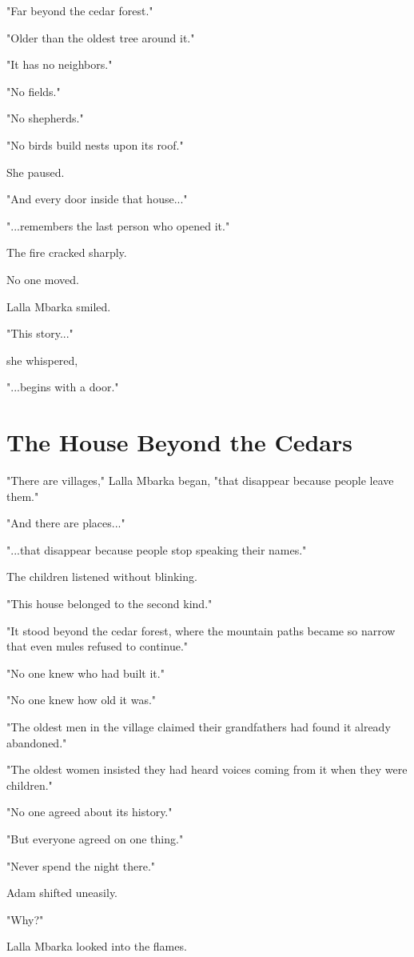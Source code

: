 \documentclass[12pt,openany]{book}
\begin{document}
"Far beyond the cedar forest."

"Older than the oldest tree around it."

"It has no neighbors."

"No fields."

"No shepherds."

"No birds build nests upon its roof."

She paused.

"And every door inside that house..."

"...remembers the last person who opened it."

The fire cracked sharply.

No one moved.

Lalla Mbarka smiled.

"This story..."

she whispered,

"...begins with a door."
\section*{The House Beyond the Cedars}

"There are villages," Lalla Mbarka began, "that disappear because people leave them."

"And there are places..."

"...that disappear because people stop speaking their names."

The children listened without blinking.

"This house belonged to the second kind."

"It stood beyond the cedar forest, where the mountain paths became so narrow that even mules refused to continue."

"No one knew who had built it."

"No one knew how old it was."

"The oldest men in the village claimed their grandfathers had found it already abandoned."

"The oldest women insisted they had heard voices coming from it when they were children."

"No one agreed about its history."

"But everyone agreed on one thing."

"Never spend the night there."

Adam shifted uneasily.

"Why?"

Lalla Mbarka looked into the flames.
\end{document}

